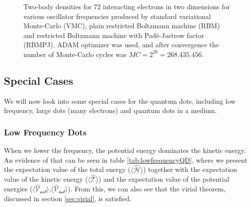 \begin{landscape}
\begin{figure} [H]
		\caption{Two-body densities for 72 interacting electrons in two dimensions for various oscillator frequencies produced by standard variational Monte-Carlo (VMC), plain restricted Boltzmann machine (RBM) and restricted Boltzmann machine with Padé-Jastrow factor (RBMPJ). ADAM optimizer was used, and after convergence the number of Monte-Carlo cycles was $MC=2^{28}=268.435.456$.}%
		\label{fig:TB_interaction_3D_2}
	\end{figure}
\fi
\end{landscape}

\subsection{Special Cases}
We will now look into some special cases for the quantum dots, including low frequency, large dots (many electrons) and quantum dots in a medium. 

\subsubsection{Low Frequency Dots}
When we lower the frequency, the potential energy dominates the kinetic energy. An evidence of that can be seen in table \eqref{tab:lowfrequencyQD}, where we present the expectation value of the total energy ($\langle \hat{\mathcal{H}}\rangle$) together with the expectation value of the kinetic energy ($\langle \hat{\mathcal{T}}\rangle$) and the expectation value of the potential energies ($\langle \mathcal{\hat{V}_{\text{ext}}} \rangle$,$\langle \mathcal{\hat{V}_{\text{int}}} \rangle$). From this, we can also see that the virial theorem, discussed in section \ref{sec:virial}, is satisfied.

